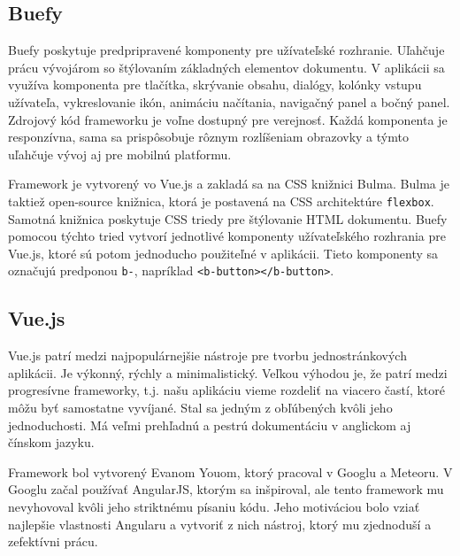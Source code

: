 \subsection*{Buefy}
Buefy poskytuje predpripravené komponenty pre užívateľské rozhranie. Uľahčuje prácu vývojárom so štýlovaním základných elementov dokumentu. V aplikácii sa využíva komponenta pre tlačítka, skrývanie obsahu, dialógy, kolónky vstupu užívateľa, vykreslovanie ikón, animáciu načítania, navigačný panel a bočný panel. Zdrojový kód frameworku je voľne dostupný pre verejnosť. Každá komponenta je responzívna, sama sa prispôsobuje rôznym rozlíšeniam obrazovky a týmto uľahčuje vývoj aj pre mobilnú platformu. 

Framework je vytvorený vo Vue.js a zakladá sa na CSS knižnici Bulma. Bulma je taktiež open-source knižnica, ktorá je postavená na CSS architektúre \texttt{flexbox}. Samotná knižnica poskytuje CSS triedy pre štýlovanie HTML dokumentu. Buefy pomocou týchto tried vytvorí jednotlivé komponenty užívateľského rozhrania pre Vue.js, ktoré sú potom jednoducho použiteľné v aplikácii. Tieto komponenty sa označujú predponou \texttt{b-}, napríklad \texttt{<b-button></b-button>}.

\subsection{Vue.js}
Vue.js\cite{vue-guide} patrí medzi najpopulárnejšie nástroje pre tvorbu jednostránkových aplikácii. Je výkonný, rýchly a minimalistický. Veľkou výhodou je, že patrí medzi progresívne frameworky, t.j. našu aplikáciu vieme rozdeliť na viacero častí, ktoré môžu byť samostatne vyvíjané. Stal sa jedným z obľúbených kvôli jeho jednoduchosti. Má veľmi prehľadnú a pestrú dokumentáciu v anglickom aj čínskom jazyku.

Framework bol vytvorený Evanom Youom, ktorý pracoval v Googlu a Meteoru. V Googlu začal používať AngularJS, ktorým sa inšpiroval, ale tento framework mu nevyhovoval kvôli jeho striktnému písaniu kódu. Jeho motiváciou bolo vziať najlepšie vlastnosti Angularu a vytvoriť z nich nástroj, ktorý mu zjednoduší a zefektívni prácu.


